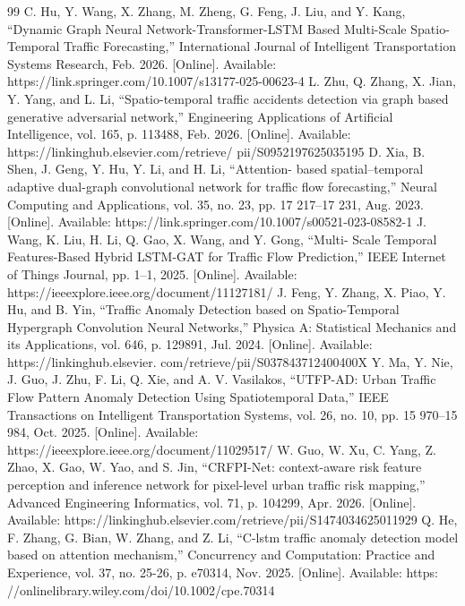 \begin{thebibliography}{99}
 C. Hu, Y. Wang, X. Zhang, M. Zheng, G. Feng, J. Liu, and Y. Kang, “Dynamic Graph Neural Network-Transformer-LSTM Based Multi-Scale Spatio-Temporal Traffic Forecasting,” International Journal of Intelligent Transportation Systems Research, Feb. 2026. [Online]. Available: https://link.springer.com/10.1007/s13177-025-00623-4
 L. Zhu, Q. Zhang, X. Jian, Y. Yang, and L. Li, “Spatio-temporal traffic accidents detection via graph based generative adversarial network,” Engineering Applications of Artificial Intelligence, vol. 165, p. 113488, Feb. 2026. [Online]. Available: https://linkinghub.elsevier.com/retrieve/ pii/S0952197625035195
 D. Xia, B. Shen, J. Geng, Y. Hu, Y. Li, and H. Li, “Attention- based spatial–temporal adaptive dual-graph convolutional network for traffic flow forecasting,” Neural Computing and Applications, vol. 35, no. 23, pp. 17 217–17 231, Aug. 2023. [Online]. Available: https://link.springer.com/10.1007/s00521-023-08582-1
 J. Wang, K. Liu, H. Li, Q. Gao, X. Wang, and Y. Gong, “Multi- Scale Temporal Features-Based Hybrid LSTM-GAT for Traffic Flow Prediction,” IEEE Internet of Things Journal, pp. 1–1, 2025. [Online]. Available: https://ieeexplore.ieee.org/document/11127181/
 J. Feng, Y. Zhang, X. Piao, Y. Hu, and B. Yin, “Traffic Anomaly Detection based on Spatio-Temporal Hypergraph Convolution Neural Networks,” Physica A: Statistical Mechanics and its Applications, vol. 646, p. 129891, Jul. 2024. [Online]. Available: https://linkinghub.elsevier. com/retrieve/pii/S037843712400400X
 Y. Ma, Y. Nie, J. Guo, J. Zhu, F. Li, Q. Xie, and A. V. Vasilakos, “UTFP-AD: Urban Traffic Flow Pattern Anomaly Detection Using Spatiotemporal Data,” IEEE Transactions on Intelligent Transportation Systems, vol. 26, no. 10, pp. 15 970–15 984, Oct. 2025. [Online]. Available: https://ieeexplore.ieee.org/document/11029517/
 W. Guo, W. Xu, C. Yang, Z. Zhao, X. Gao, W. Yao, and S. Jin, “CRFPI-Net: context-aware risk feature perception and inference network for pixel-level urban traffic risk mapping,” Advanced Engineering Informatics, vol. 71, p. 104299, Apr. 2026. [Online]. Available: https://linkinghub.elsevier.com/retrieve/pii/S1474034625011929
 Q. He, F. Zhang, G. Bian, W. Zhang, and Z. Li, “C-lstm traffic anomaly detection model based on attention mechanism,” Concurrency and Computation: Practice and Experience, vol. 37, no. 25-26, p. e70314, Nov. 2025. [Online]. Available: https: //onlinelibrary.wiley.com/doi/10.1002/cpe.70314

\end{thebibliography}
